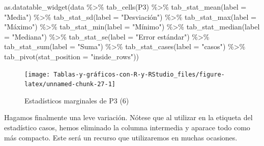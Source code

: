 \documentclass[
]{book}
\newenvironment{Shaded}{\begin{snugshade}}{\end{snugshade}}
\newcommand{\AttributeTok}[1]{\textcolor[rgb]{0.77,0.63,0.00}{#1}}
\newcommand{\FunctionTok}[1]{\textcolor[rgb]{0.00,0.00,0.00}{#1}}
\newcommand{\NormalTok}[1]{#1}
\newcommand{\SpecialCharTok}[1]{\textcolor[rgb]{0.00,0.00,0.00}{#1}}
\newcommand{\StringTok}[1]{\textcolor[rgb]{0.31,0.60,0.02}{#1}}
\begin{document}
\begin{Shaded}
\begin{Highlighting}[]
\FunctionTok{as.datatable\_widget}\NormalTok{(data }\SpecialCharTok{\%\textgreater{}\%} \FunctionTok{tab\_cells}\NormalTok{(P3) }\SpecialCharTok{\%\textgreater{}\%} \FunctionTok{tab\_stat\_mean}\NormalTok{(}\AttributeTok{label =} \StringTok{"Media"}\NormalTok{) }\SpecialCharTok{\%\textgreater{}\%} 
  \FunctionTok{tab\_stat\_sd}\NormalTok{(}\AttributeTok{label =} \StringTok{"Desviación"}\NormalTok{) }\SpecialCharTok{\%\textgreater{}\%} \FunctionTok{tab\_stat\_max}\NormalTok{(}\AttributeTok{label =} \StringTok{"Máximo"}\NormalTok{) }\SpecialCharTok{\%\textgreater{}\%} 
  \FunctionTok{tab\_stat\_min}\NormalTok{(}\AttributeTok{label =} \StringTok{"Mínimo"}\NormalTok{) }\SpecialCharTok{\%\textgreater{}\%} \FunctionTok{tab\_stat\_median}\NormalTok{(}\AttributeTok{label =} \StringTok{"Mediana"}\NormalTok{) }\SpecialCharTok{\%\textgreater{}\%} 
  \FunctionTok{tab\_stat\_se}\NormalTok{(}\AttributeTok{label =} \StringTok{"Error estándar"}\NormalTok{) }\SpecialCharTok{\%\textgreater{}\%} \FunctionTok{tab\_stat\_sum}\NormalTok{(}\AttributeTok{label =} \StringTok{"Suma"}\NormalTok{) }\SpecialCharTok{\%\textgreater{}\%} 
  \FunctionTok{tab\_stat\_cases}\NormalTok{(}\AttributeTok{label =} \StringTok{"casos"}\NormalTok{) }\SpecialCharTok{\%\textgreater{}\%} \FunctionTok{tab\_pivot}\NormalTok{(}\AttributeTok{stat\_position =} \StringTok{"inside\_rows"}\NormalTok{))}
\end{Highlighting}
\end{Shaded}

\begin{figure}[H]

{\centering \texttt{[image: Tablas-y-gráficos-con-R-y-RStudio\_files/figure-latex/unnamed-chunk-27-1]} 

}

\caption{Estadísticos marginales de P3 (6)}\label{fig:unnamed-chunk-27}
\end{figure}

Hagamos finalmente una leve variación. Nótese que al utilizar \texttt{\textquotesingle{}\textbar{}\textquotesingle{}}en la etiqueta del estadístico casos, hemos eliminado la columna intermedia y aparace todo como más compacto. Este será un recurso que utilizaremos en muchas ocasiones.
\end{document}
